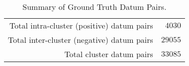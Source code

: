 \begin{table}[htp]
	\begin{center}
	\caption{Summary of Ground Truth Datum Pairs.}
	\label{tab:ch6_table_pair_summary}
		\begin{tabular}{r r}
		\toprule
			Total intra-cluster (positive) datum pairs & $4030$\\
			Total inter-cluster (negative) datum pairs & $29055$\\
			\midrule Total cluster datum pairs & $33085$\\
		\bottomrule
		\end{tabular}
	\end{center}
\end{table}